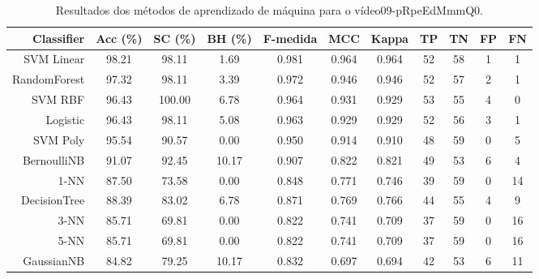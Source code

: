 \begin{table}[!htb]
\centering
\caption{Resultados dos métodos de aprendizado de máquina para o vídeo09-pRpeEdMmmQ0.}
\label{tab:09-pRpeEdMmmQ0}
\begin{tabular}{r|c|c|c|c|c|c|c|c|c|c}
\hline\hline
Classifier & Acc (\%) & SC (\%) & BH (\%) & F-medida & MCC & Kappa & TP & TN & FP & FN \\ \hline
SVM Linear & 98.21 & 98.11 & 1.69 & 0.981 & 0.964 & 0.964 & 52 & 58 & 1 & 1 \\ 
RandomForest & 97.32 & 98.11 & 3.39 & 0.972 & 0.946 & 0.946 & 52 & 57 & 2 & 1 \\ 
SVM RBF & 96.43 & 100.00 & 6.78 & 0.964 & 0.931 & 0.929 & 53 & 55 & 4 & 0 \\ 
Logistic & 96.43 & 98.11 & 5.08 & 0.963 & 0.929 & 0.929 & 52 & 56 & 3 & 1 \\ 
SVM Poly & 95.54 & 90.57 & 0.00 & 0.950 & 0.914 & 0.910 & 48 & 59 & 0 & 5 \\ 
BernoulliNB & 91.07 & 92.45 & 10.17 & 0.907 & 0.822 & 0.821 & 49 & 53 & 6 & 4 \\ 
1-NN & 87.50 & 73.58 & 0.00 & 0.848 & 0.771 & 0.746 & 39 & 59 & 0 & 14 \\ 
DecisionTree & 88.39 & 83.02 & 6.78 & 0.871 & 0.769 & 0.766 & 44 & 55 & 4 & 9 \\ 
3-NN & 85.71 & 69.81 & 0.00 & 0.822 & 0.741 & 0.709 & 37 & 59 & 0 & 16 \\ 
5-NN & 85.71 & 69.81 & 0.00 & 0.822 & 0.741 & 0.709 & 37 & 59 & 0 & 16 \\ 
GaussianNB & 84.82 & 79.25 & 10.17 & 0.832 & 0.697 & 0.694 & 42 & 53 & 6 & 11 \\ 
\hline\hline
\end{tabular}
\end{table}
